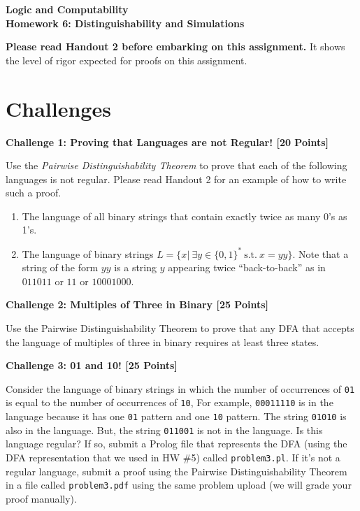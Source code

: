 \documentclass[12pt]{article}
\newcommand{\DoNotShare}{\large \noindent \textbf{Under the Harvey Mudd Honor Code, this document is not to be shared.} \normalsize}
\newcommand{\Problem}[3]{\mbox{} \newline \noindent \textbf{\textbf{Challenge #1: #2 [#3 Points] \\ }}}
\begin{document}
\begin{center}
	\bf
	Logic and Computability  \\
	Homework 6:  Distinguishability and Simulations \\
\end{center}


\textbf{Please read Handout 2 before embarking on this assignment.} It shows the level of rigor expected for proofs on this assignment.

\section*{Challenges}

\Problem{1}{Proving that Languages are not Regular!}{20}

Use the \emph{Pairwise Distinguishability Theorem} to prove that each of the following languages is not regular.  Please read Handout 2 for an example of how to write such a proof.

\begin{enumerate}
	\item The language of all binary strings that contain exactly twice as many 0's as 1's.
	\item The language of binary strings $L = \{x | \ \exists y \in \{ 0, 1\}^{*} \ \mbox{s.t.}\ x = yy \}$.  Note that a string of the form $yy$ is a string $y$ appearing twice ``back-to-back'' as in $011011$ or $11$ or $10001000$.
\end{enumerate}

\Problem{2}{Multiples of Three in Binary}{25}

Use the Pairwise Distinguishability Theorem to prove that any DFA that accepts the language of multiples of three in binary requires at least three states. 

\Problem{3}{01 and 10!}{25}

Consider the language of binary strings in which the number of occurrences of \verb+01+ is equal to the number of occurrences of \verb+10+,  For example,
\verb+00011110+ is in the language because it has one \verb+01+ pattern and one \verb+10+ pattern.  The string \verb+01010+ is also in the language.  But, the string \verb+011001+ is not in the language.
Is this language regular?  If so, submit a Prolog file that represents the DFA (using the DFA representation that we used in HW \#5) called \verb+problem3.pl+.  If it's not a regular language, submit a proof using the Pairwise Distinguishability Theorem in a file called \verb+problem3.pdf+ using the same problem upload (we will grade your proof manually).
 
\end{document}
